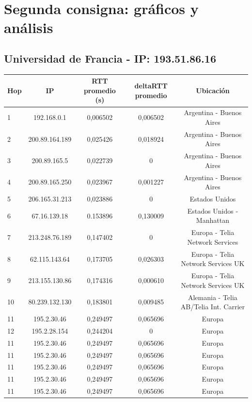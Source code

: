 \section{Segunda consigna: gráficos y análisis}

\subsection{Universidad de Francia - IP: 193.51.86.16}

\bigskip

\begin{tabular}{ | l | c | c | c | c |}
 \hline                 
   Hop & IP &  RTT promedio (s)  & deltaRTT promedio & Ubicación\\
 \hline 
   1 & 192.168.0.1 & 0,006502 & 0,006502 & Argentina - Buenos Aires\\ 
 \hline 
   2 & 200.89.164.189 & 0,025426 & 0,018924 & Argentina - Buenos Aires\\ 
  \hline 
   3 & 200.89.165.5 & 0,022739 & 0 & Argentina - Buenos Aires\\ 
  \hline 
   4 & 200.89.165.250 & 0,023967 & 0,001227 & Argentina - Buenos Aires\\ 
  \hline 
   5 & 206.165.31.213 & 0,023886 & 0 & Estados Unidos\\ 
  \hline 
   6 & 67.16.139.18 & 0.153896 & 0,130009 & Estados Unidos - Manhattan\\ 
  \hline 
   7 & 213.248.76.189 & 0,147402 & 0 & Europa - Telia Network Services\\ 
  \hline 
   8 & 62.115.143.64 & 0,173705 & 0,026303 & Europa - Telia Network Services UK\\ 
  \hline 
   9 & 213.155.130.86 & 0,174316 & 0,000610 & Europa - Telia Network Services UK\\ 
  \hline 
   10 & 80.239.132.130 & 0,183801 & 0,009485 & Alemania - Telia AB/Telia Int. Carrier\\ 
  \hline 
   11 & 195.2.30.46 & 0,249497 & 0,065696 & Europa\\ 
  \hline 
   12 & 195.2.28.154 & 0,244204 & 0 & Europa\\ 
  \hline 
   11 & 195.2.30.46 & 0,249497 & 0,065696 & Europa\\ 
  \hline 
   11 & 195.2.30.46 & 0,249497 & 0,065696 & Europa\\ 
  \hline 
   11 & 195.2.30.46 & 0,249497 & 0,065696 & Europa\\ 
  \hline 
   11 & 195.2.30.46 & 0,249497 & 0,065696 & Europa\\ 
  \hline 
   11 & 195.2.30.46 & 0,249497 & 0,065696 & Europa\\ 
 \hline 
\end{tabular}

